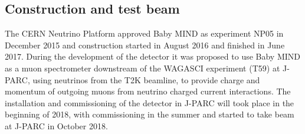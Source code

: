 

\subsection{Construction and test beam}

The CERN Neutrino Platform approved Baby MIND as experiment NP05 in December 2015 and construction started in August 2016 and finished in June 2017. During the development of the detector it was proposed to use Baby MIND as a muon spectrometer downstream of the WAGASCI experiment (T59) at J-PARC, using neutrinos from the T2K beamline, to provide charge and momentum of outgoing muons from neutrino charged current interactions. The installation and commissioning of the detector in J-PARC will took place in the beginning of 2018, with commissioning in the summer and started to take beam at J-PARC in October 2018.

